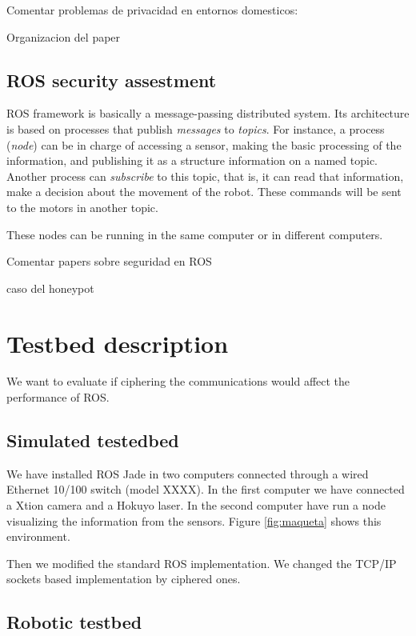 \documentclass[journal,twoside]{JoPhA}
\begin{document}
Comentar problemas de privacidad en entornos domesticos: \cite{Denning09}

Organizacion del paper




\subsection{ROS security assestment}

ROS framework is basically a message-passing distributed system. Its architecture is based on processes that publish {\em messages} to {\em topics}. For instance, a process ({\em node}) can be in charge of accessing a sensor, making the basic processing of the information, and publishing it as a structure information on a named topic. Another process can {\em subscribe} to this topic, that is, it can read that information, make a decision about the movement of the robot. These commands will be sent to the motors in another topic.

These nodes can be running in the same computer or in different computers. 

Comentar papers sobre seguridad en ROS 

caso del honeypot \cite{McClean2013}





\section{Testbed description}

We want to evaluate if ciphering the communications would affect the performance of ROS. 


\subsection{Simulated testedbed}

We have installed ROS Jade in two computers connected through a wired Ethernet 10/100 switch (model XXXX). In the first computer we have connected a Xtion camera and a Hokuyo laser. In the second computer have run a node visualizing the information from the sensors. Figure \ref{fig:maqueta} shows this environment.


Then we modified the standard ROS implementation. We changed the TCP/IP sockets based implementation by ciphered ones.


\subsection{Robotic testbed}
\end{document}
